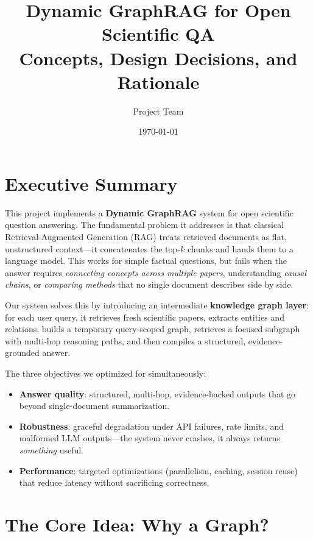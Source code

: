 \documentclass[11pt]{article}
\title{Dynamic GraphRAG for Open Scientific QA\\
\large Concepts, Design Decisions, and Rationale}
\author{Project Team}
\date{\today}
\begin{document}
\maketitle
\tableofcontents
\newpage

\section{Executive Summary}

This project implements a \textbf{Dynamic GraphRAG} system for open scientific question answering. The fundamental problem it addresses is that classical Retrieval-Augmented Generation (RAG) treats retrieved documents as flat, unstructured context---it concatenates the top-$k$ chunks and hands them to a language model. This works for simple factual questions, but fails when the answer requires \emph{connecting concepts across multiple papers}, understanding \emph{causal chains}, or \emph{comparing methods} that no single document describes side by side.

Our system solves this by introducing an intermediate \textbf{knowledge graph layer}: for each user query, it retrieves fresh scientific papers, extracts entities and relations, builds a temporary query-scoped graph, retrieves a focused subgraph with multi-hop reasoning paths, and then compiles a structured, evidence-grounded answer.

The three objectives we optimized for simultaneously:
\begin{itemize}[leftmargin=1.2em]
  \item \textbf{Answer quality}: structured, multi-hop, evidence-backed outputs that go beyond single-document summarization.
  \item \textbf{Robustness}: graceful degradation under API failures, rate limits, and malformed LLM outputs---the system never crashes, it always returns \emph{something} useful.
  \item \textbf{Performance}: targeted optimizations (parallelism, caching, session reuse) that reduce latency without sacrificing correctness.
\end{itemize}

\section{The Core Idea: Why a Graph?}
\end{document}
